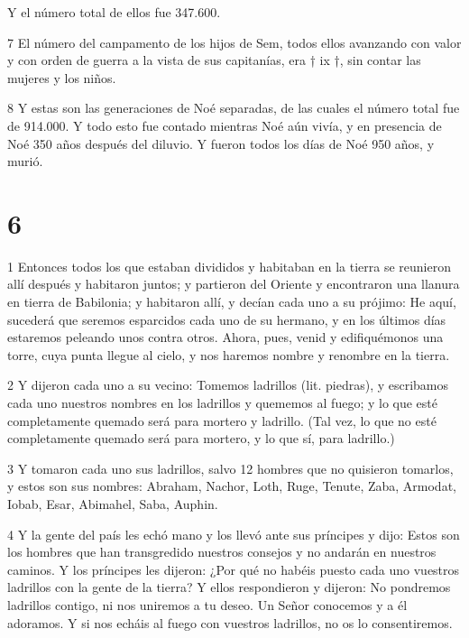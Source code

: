 \par Y el número total de ellos fue 347.600.

\par 7 El número del campamento de los hijos de Sem, todos ellos avanzando con valor y con orden de guerra a la vista de sus capitanías, era † ix †, sin contar las mujeres y los niños.

\par 8 Y estas son las generaciones de Noé separadas, de las cuales el número total fue de 914.000. Y todo esto fue contado mientras Noé aún vivía, y en presencia de Noé 350 años después del diluvio. Y fueron todos los días de Noé 950 años, y murió.

\chapter{6}

\par 1 Entonces todos los que estaban divididos y habitaban en la tierra se reunieron allí después y habitaron juntos; y partieron del Oriente y encontraron una llanura en tierra de Babilonia; y habitaron allí, y decían cada uno a su prójimo: He aquí, sucederá que seremos esparcidos cada uno de su hermano, y en los últimos días estaremos peleando unos contra otros. Ahora, pues, venid y edifiquémonos una torre, cuya punta llegue al cielo, y nos haremos nombre y renombre en la tierra.

\par 2 Y dijeron cada uno a su vecino: Tomemos ladrillos (lit. piedras), y escribamos cada uno nuestros nombres en los ladrillos y quememos al fuego; y lo que esté completamente quemado será para mortero y ladrillo. (Tal vez, lo que no esté completamente quemado será para mortero, y lo que sí, para ladrillo.)

\par 3 Y tomaron cada uno sus ladrillos, salvo 12 hombres que no quisieron tomarlos, y estos son sus nombres: Abraham, Nachor, Loth, Ruge, Tenute, Zaba, Armodat, Iobab, Esar, Abimahel, Saba, Auphin.

\par 4 Y la gente del país les echó mano y los llevó ante sus príncipes y dijo: Estos son los hombres que han transgredido nuestros consejos y no andarán en nuestros caminos. Y los príncipes les dijeron: ¿Por qué no habéis puesto cada uno vuestros ladrillos con la gente de la tierra? Y ellos respondieron y dijeron: No pondremos ladrillos contigo, ni nos uniremos a tu deseo. Un Señor conocemos y a él adoramos. Y si nos echáis al fuego con vuestros ladrillos, no os lo consentiremos.

